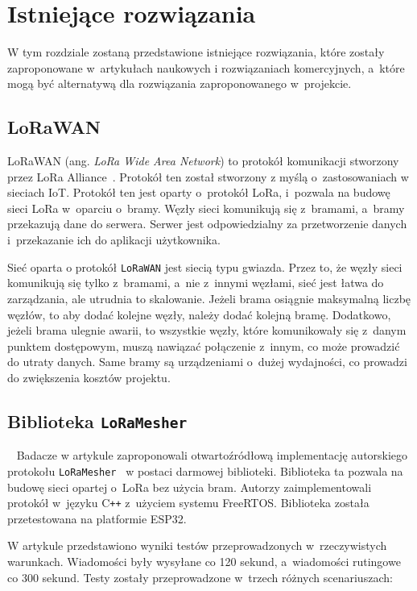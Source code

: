 \chapter{Istniejące rozwiązania}
W tym rozdziale zostaną przedstawione istniejące rozwiązania, które zostały zaproponowane w~artykułach naukowych i rozwiązaniach komercyjnych, a~które mogą być alternatywą dla rozwiązania zaproponowanego w~projekcie.
\section{LoRaWAN}

LoRaWAN (ang. \emph{LoRa Wide Area Network}) to protokół komunikacji stworzony przez LoRa Alliance~\cite{lora:about}.
Protokół ten został stworzony z myślą o~zastosowaniach w sieciach IoT.
Protokół ten jest oparty o~protokół LoRa, i~pozwala na budowę sieci LoRa w~oparciu o~bramy.
Węzły sieci komunikują się z~bramami, a~bramy przekazują dane do serwera.
Serwer jest odpowiedzialny za przetworzenie danych i~przekazanie ich do aplikacji użytkownika.

Sieć oparta o protokół \texttt{LoRaWAN} jest siecią typu gwiazda. Przez to, że węzły sieci komunikują się tylko z~bramami, a~nie z~innymi węzłami, sieć jest łatwa do zarządzania, ale utrudnia to skalowanie. Jeżeli brama osiągnie maksymalną liczbę węzłów, to aby dodać kolejne węzły, należy dodać kolejną bramę. Dodatkowo, jeżeli brama ulegnie awarii, to wszystkie węzły, które komunikowały się z~danym punktem dostępowym, muszą nawiązać połączenie z~innym, co może prowadzić do utraty danych. Same bramy są urządzeniami o~dużej wydajności, co prowadzi do zwiększenia kosztów projektu.


\section{Biblioteka \texttt{LoRaMesher}}~\label{sec:loramesher}
Badacze w artykule zaproponowali otwartoźródłową implementację autorskiego protokołu \texttt{LoRaMesher}~\cite{bib:loramesher} w postaci darmowej biblioteki.
Biblioteka ta pozwala na budowę sieci opartej o~LoRa bez użycia bram.
Autorzy zaimplementowali protokół w~języku C\texttt{++} z~użyciem systemu FreeRTOS.
Biblioteka została przetestowana na platformie ESP32.

W artykule przedstawiono wyniki testów przeprowadzonych w~rzeczywistych warunkach.
Wiadomości były wysyłane co 120 sekund, a~wiadomości rutingowe co 300 sekund.
Testy zostały przeprowadzone w~trzech różnych scenariuszach:

